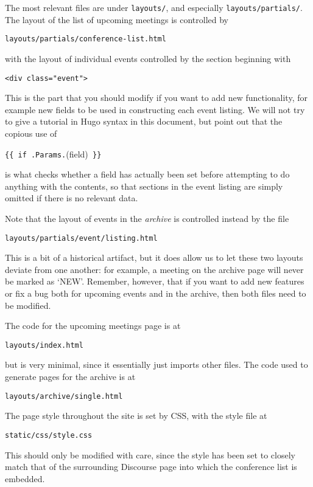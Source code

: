 \documentclass[12pt]{scrartcl}
\theoremstyle{definition}
\begin{document}
The most relevant files are under \verb|layouts/|, and especially \verb|layouts/partials/|.
The layout of the list of upcoming meetings is controlled by
\begin{center}
\verb|layouts/partials/conference-list.html|
\end{center}
with the layout of individual events controlled by the section beginning with
\begin{center}
\verb|<div class="event">|
\end{center}
This is the part that you should modify if you want to add new functionality, for example new fields to be used in constructing each event listing.
We will not try to give a tutorial in Hugo syntax in this document, but point out that the copious use of
\begin{center}
\verb|{{ if .Params.|(field)\verb| }}|
\end{center}
is what checks whether a field has actually been set before attempting to do anything with the contents, so that sections in the event listing are simply omitted if there is no relevant data.

Note that the layout of events in the \emph{archive} is controlled instead by the file
\begin{center}
\verb|layouts/partials/event/listing.html|
\end{center}
This is a bit of a historical artifact, but it does allow us to let these two layouts deviate from one another: for example, a meeting on the archive page will never be marked as `NEW'. Remember, however, that if you want to add new features or fix a bug both for upcoming events and in the archive, then both files need to be modified.

The code for the upcoming meetings page is at
\begin{center}
\verb|layouts/index.html|
\end{center}
but is very minimal, since it essentially just imports other files.
The code used to generate pages for the archive is at 
\begin{center}
\verb|layouts/archive/single.html|
\end{center}
The page style throughout the site is set by CSS, with the style file at
\begin{center}
\verb|static/css/style.css|
\end{center}
This should only be modified with care, since the style has been set to closely match that of the surrounding Discourse page into which the conference list is embedded.
\end{document}
